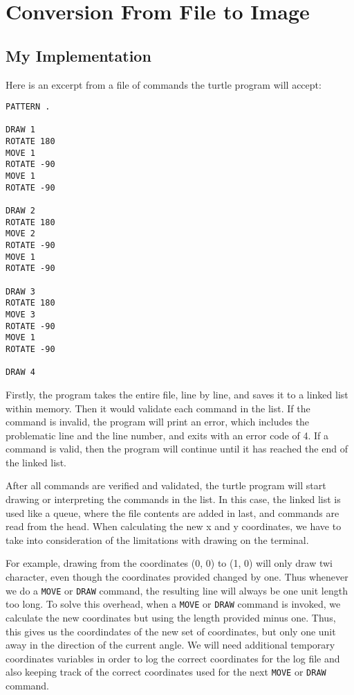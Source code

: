 \documentclass[a4paper, 12pt, titlepage]{article}
\newcommand{\code}[1]{\small\texttt{#1}\normalsize}
\begin{document}
\section{Conversion From File to Image}

\subsection{My Implementation}

Here is an excerpt from a file of commands the turtle program will accept:

\begin{lstlisting}
PATTERN .

DRAW 1
ROTATE 180
MOVE 1
ROTATE -90
MOVE 1
ROTATE -90

DRAW 2
ROTATE 180
MOVE 2
ROTATE -90
MOVE 1
ROTATE -90

DRAW 3
ROTATE 180
MOVE 3
ROTATE -90
MOVE 1
ROTATE -90

DRAW 4
\end{lstlisting}

Firstly, the program takes the entire file, line by line, and saves it to 
a linked list within memory. Then it would validate each command in the list. 
If the command is invalid, the program will print an error, which includes 
the problematic line and the line number, and exits with an error code of 4. 
If a command is valid, then the program will continue until it has reached 
the end of the linked list.

After all commands are verified and validated, the turtle program will start 
drawing or interpreting the commands in the list. In this case, the linked 
list is used like a queue, where the file contents are added in last, and 
commands are read from the head. When calculating the new x and y coordinates, 
we have to take into consideration of the limitations with drawing on the 
terminal.

For example, drawing from the coordinates (0, 0) to (1, 0) will only draw 
twi character, even though the coordinates provided changed by one. 
Thus whenever we do a \code{MOVE} or \code{DRAW} command, the resulting 
line will always be one unit length too long. To solve this overhead, 
when a \code{MOVE} or \code{DRAW} command is invoked, we calculate the 
new coordinates but using the length provided minus one. Thus, this gives 
us the coordindates of the new set of coordinates, but only one unit away 
in the direction of the current angle. We will need additional temporary 
coordinates variables in order to log the correct coordinates for the log 
file and also keeping track of the correct coordinates used for the next
\code{MOVE} or \code{DRAW} command.
\end{document}
